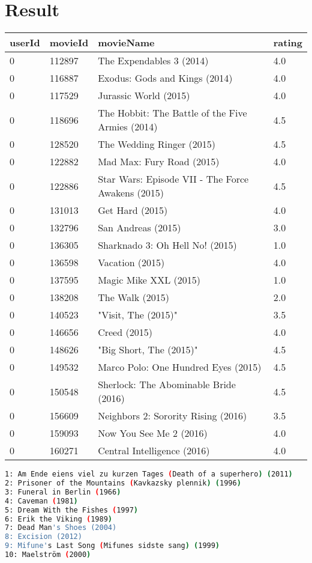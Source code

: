 \documentclass[main.tex]{thesis.tex}
\begin{document}
\chapter{Result}

\begin{tabular}{llll}
	userId & movieId & movieName & rating \\ \hline
	0 & 112897 & The Expendables 3 (2014) & 4.0 \\
	0 & 116887 & Exodus: Gods and Kings (2014) & 4.0 \\
	0 & 117529 & Jurassic World (2015) & 4.0 \\
	0 & 118696 & The Hobbit: The Battle of the Five Armies (2014) & 4.5 \\
	0 & 128520 & The Wedding Ringer (2015) & 4.5 \\
	0 & 122882 & Mad Max: Fury Road (2015) & 4.0 \\
	0 & 122886 & Star Wars: Episode VII - The Force Awakens (2015) & 4.5 \\
	0 & 131013 & Get Hard (2015) & 4.0 \\
	0 & 132796 & San Andreas (2015) & 3.0 \\
	0 & 136305 & Sharknado 3: Oh Hell No! (2015) & 1.0 \\
	0 & 136598 & Vacation (2015) & 4.0 \\
	0 & 137595 & Magic Mike XXL (2015) & 1.0 \\
	0 & 138208 & The Walk (2015) & 2.0 \\
	0 & 140523 & "Visit, The (2015)" & 3.5 \\
	0 & 146656 & Creed (2015) & 4.0 \\
	0 & 148626 & "Big Short, The (2015)" & 4.5 \\
	0 & 149532 & Marco Polo: One Hundred Eyes (2015) & 4.5 \\
	0 & 150548 & Sherlock: The Abominable Bride (2016) & 4.5 \\
	0 & 156609 & Neighbors 2: Sorority Rising (2016) & 3.5 \\
	0 & 159093 & Now You See Me 2 (2016) & 4.0 \\
	0 & 160271 & Central Intelligence (2016) & 4.0 \\
\end{tabular}

\begin{lstlisting}[caption=Recommended movies, language=sh]
1: Am Ende eiens viel zu kurzen Tages (Death of a superhero) (2011)
2: Prisoner of the Mountains (Kavkazsky plennik) (1996)
3: Funeral in Berlin (1966)
4: Caveman (1981)
5: Dream With the Fishes (1997)
6: Erik the Viking (1989)
7: Dead Man's Shoes (2004)
8: Excision (2012)
9: Mifune's Last Song (Mifunes sidste sang) (1999)
10: Maelström (2000)
\end{lstlisting}
\end{document}
